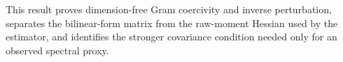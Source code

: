 This result proves dimension-free Gram coercivity and inverse perturbation, separates the bilinear-form matrix from the raw-moment Hessian used by the estimator, and identifies the stronger covariance condition needed only for an observed spectral proxy.